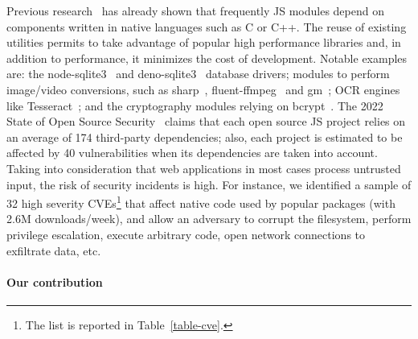 Previous research~\cite{staicu2021bilingual,npm-malicious-update} has
already shown that frequently JS modules depend on components written
in native languages such as C or C++.  The reuse of existing utilities
permits to take advantage of popular high performance libraries and,
in addition to performance, it minimizes the cost of
development. Notable examples are: the node-sqlite3~\cite{
  node-sqlite3} and deno-sqlite3~\cite{deno-sqlite3} database drivers;
modules to perform image/video conversions, such as
sharp~\cite{sharp}, fluent-ffmpeg~\cite{fluentffmpeg-npm} and
gm~\cite{gm-npm}; OCR engines like Tesseract~\cite{tesseract}; and the
cryptography modules relying on bcrypt~\cite{bcrypt}. The 2022 State
of Open Source Security~\cite{snyk-report} claims that each open
source JS project relies on an average of 174 third-party
dependencies; also, each project is estimated to be affected by 40
vulnerabilities when its dependencies are taken into account. Taking
into consideration that web applications in most cases process
untrusted input, the risk of security incidents is high. For instance,
we identified a sample of 32 high severity CVEs\footnote{The list is
  reported in Table~\ref{table-cve}.} that affect native code used by
popular packages (with 2.6M \mbox{downloads/week}), and allow an
adversary to corrupt the filesystem, perform privilege escalation,
execute arbitrary code, open network connections to exfiltrate data,
etc.

\paragraph*{Our contribution}

